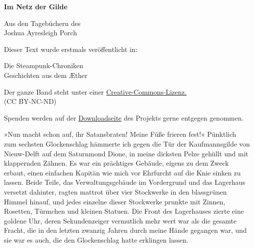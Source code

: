 \usepackage[ngerman]{babel}
\usepackage[T1]{fontenc}



\newcommand\bigpar\medskip
\newcommand\schiff\textit
\newcommand\latein\textit


\raggedbottom
\begin{center}
\textbf{\huge\textsf{Im Netz der Gilde}}

\medskip
Aus den Tagebüchern des \\
Joshua Ayresleigh Porch
\end{center}

\bigskip

\begin{flushleft}
Dieser Text wurde erstmals veröffentlicht in:
\begin{center}
Die Steampunk-Chroniken\\
Geschichten aus dem Æther
\end{center}

\bigskip

Der ganze Band steht unter einer 
\href{http://creativecommons.org/licenses/by-nc-nd/2.0/de/}{Creative-Commons-Lizenz.} \\ 
(CC BY-NC-ND)

\bigskip

Spenden werden auf der 
\href{http://steampunk-chroniken.de/download}{Downloadseite}
des Projekts gerne entgegen genommen. 
\end{flushleft}

\newpage

»Nun macht schon auf, ihr Satansbraten! Meine Füße frieren fest!«
Pünktlich zum sechsten Glockenschlag hämmerte ich gegen die Tür der
Kaufmannsgilde von Nieuw-Delft auf dem Saturnmond Dione, in meine
dicksten Pelze gehüllt und mit klappernden Zähnen. Es war ein
prächtiges Gebäude, eigens zu dem Zweck erbaut, einen einfachen
Kapitän wie mich vor Ehrfurcht auf die Knie sinken zu lassen. Beide
Teile, das Verwaltungsgebäude im Vordergrund und das Lagerhaus
versetzt dahinter, ragten mattrot über vier Stockwerke in den
blassgrünen Himmel hinauf, und jedes einzelne dieser Stockwerke
prunkte mit Zinnen, Rosetten, Türmchen und kleinen Statuen. Die
Front des Lagerhauses zierte eine goldene Uhr, deren Sekundenzeiger
vermutlich mehr wert war als die gesamte Fracht, die in den letzten
zwanzig Jahren durch meine Hände gegangen war, und sie war es auch,
die den Glockenschlag hatte erklingen lassen.

